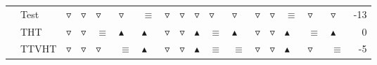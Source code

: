 \begin{table}
\begin{tabular}{lllllllllllllllllr}
       & Test &  $\triangledown$ &   $\triangledown$ &   $\triangledown$ &   $\triangledown$ &          $\equiv$ &   $\triangledown$ &   $\triangledown$ &   $\triangledown$ &   $\triangledown$ &   $\triangledown$ &   $\triangledown$ &   $\triangledown$ &          $\equiv$ &   $\triangledown$ &   $\triangledown$ &              -13 \\
       & THT &  $\triangledown$ &   $\triangledown$ &          $\equiv$ &  $\blacktriangle$ &  $\blacktriangle$ &   $\triangledown$ &   $\triangledown$ &  $\blacktriangle$ &          $\equiv$ &  $\blacktriangle$ &   $\triangledown$ &   $\triangledown$ &  $\blacktriangle$ &          $\equiv$ &  $\blacktriangle$ &                0 \\
       & TTVHT &  $\triangledown$ &   $\triangledown$ &   $\triangledown$ &          $\equiv$ &  $\blacktriangle$ &   $\triangledown$ &   $\triangledown$ &  $\blacktriangle$ &          $\equiv$ &          $\equiv$ &   $\triangledown$ &   $\triangledown$ &  $\blacktriangle$ &   $\triangledown$ &          $\equiv$ &               -5 \\
\bottomrule
\end{tabular}
\end{table}
